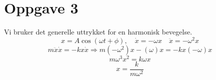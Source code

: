 \documentclass{article}
\begin{document}
\newpage
\section*{Oppgave 3}
Vi bruker det generelle uttrykket for en harmonisk bevegelse. 
\[
x = A \cos(ωt + ϕ), \quad \dot{x} = -ωx \quad \ddot{x} = -ω^{2}x
\]
\[
  m\ddot{x}\dot{x} = -  kx \dot{x} ⇒ m (-ω^{2})x -(ω)x = -kx (-ω)x
\]
\[
mω^{3} x^{2} = kωx
\]
\[
x = \frac{k}{mω^{2}}
\]
\end{document}
